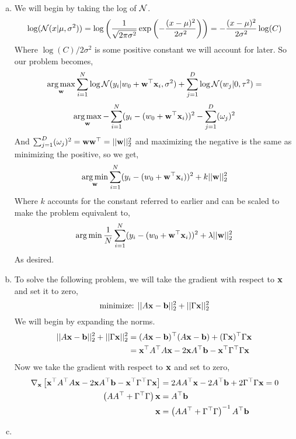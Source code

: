 \documentclass[12pt,letterpaper,fleqn]{hmcpset}
\begin{document}
\vspace{15mm}

\begin{enumerate}[(a)]
    \item 
        We will begin by taking the log of ${\cal N}$.
            $$\log({\cal N}(x|\mu,\sigma^2)) = \log\left(\frac{1}{\sqrt{2\pi\sigma^2}}\exp\left(-\frac{(x-\mu)^2}{2\sigma^2}\right)\right)=-\frac{(x-\mu)^2}{2\sigma^2}\log(C)$$
            Where $\log(C)/2\sigma^2$ is some positive constant we will account for later. So our problem becomes,
                $$\operatorname*{arg\,max}_{\bf w} \sum_{i=1}^N \log{\cal N}(y_i | w_0 + {\bf w}^\top{\bf x}_i, \sigma^2) + \sum_{j=1}^D \log{\cal N}(w_j | 0, \tau^2) =$$
                $$  \operatorname*{arg\,max}_{\bf w} -\sum_{i=1}^N (y_i-(w_0 + {\bf w}^\top{\bf x}_i))^2 - \sum_{j=1}^D (\omega_j)^2$$
            And $\sum_{j=1}^D (\omega_j)^2 = {\bf w} {\bf w}^\top = ||{\bf w}||_2^2$ and maximizing the negative is the same as minimizing the positive, so we get,
                $$  \operatorname*{arg\,min}_{\bf w} \sum_{i=1}^N (y_i-(w_0 + {\bf w}^\top{\bf x}_i))^2 + k ||{\bf w}||_2^2$$
            Where $k$ accounts for the constant referred to earlier and can be scaled to make the problem equivalent to,
                \[
                \operatorname*{arg\,min} \frac{1}{N}\sum_{i=1}^N (y_i - (w_0 + {\bf w}^\top{\bf x}_i))^2 + \lambda ||{\bf w}||_2^2
                \]
            As desired.
    \item
        To solve the following problem, we will take the gradient with respect to ${\bf x}$ and set it to zero,
            $$\text{minimize: } ||A{\bf x} - {\bf b}||_2^2 + ||\Gamma{\bf x}||_2^2$$
        We will begin by expanding the norms.
            \begin{align*}
                ||A{\bf x} - {\bf b}||_2^2 + ||\Gamma{\bf x}||_2^2 &= (A{\bf x} - {\bf b})^\top(A{\bf x} - {\bf b}) + (\Gamma {\bf x})^\top \Gamma {\bf x} \\
                &= {\bf x}^\top A^\top A {\bf x} - 2 {\bf x} A^\top {\bf b} - {\bf x}^\top \Gamma^\top \Gamma {\bf x} \\ 
            \end{align*}
        Now we take the gradient with respect to ${\bf x}$ and set to zero,
            \begin{align*}
                \nabla_{\bf x} \left[ {\bf x}^\top A^\top A {\bf x} - 2 {\bf x} A^\top {\bf b} - {\bf x}^\top \Gamma^\top \Gamma {\bf x}  \right]&= 2AA^\top {\bf x} -2A^\top {\bf b} + 2\Gamma^\top \Gamma {\bf x} = 0\\
                \left( AA^\top + \Gamma^\top \Gamma \right) {\bf x} &= A^\top{\bf b} \\
                {\bf x} &= \left( AA^\top + \Gamma^\top \Gamma \right)^{-1} A^\top{\bf b}
            \end{align*}
        \item
                    

\end{enumerate}
\end{document}

